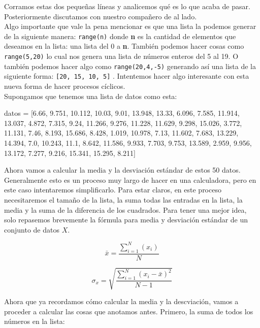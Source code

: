 \documentclass[10pt,letterpaper]{article}
\newcommand{\inlinecode}[1]{
\colorbox{light-gray}{\texttt{#1}}
}
\newenvironment{Code}
{
\begin{lrbox}{\selvestebox}%
\begin{minipage}{\dimexpr\columnwidth-2\fboxsep\relax}
\fontfamily{\ttdefault}\selectfont
}
{\end{minipage}\end{lrbox}%
\begin{center}
\colorbox{light-gray}{\usebox{\selvestebox}}
\end{center}
}
\begin{document}
Corramos estas dos peque\~nas l\'ineas y analicemos qu\'e es lo que acaba de pasar. Posteriormente discutamos con nuestro compa\~nero de al lado.\\

Algo importante que vale la pena mencionar es que una lista la podemos generar de la siguiente manera: \inlinecode{range(n)} donde \textbf{n} es la cantidad de elementos que deseamos en la lista: una lista del 0 a \textbf{n}. Tambi\'en podemos hacer cosas como \inlinecode{range(5,20)} lo cual nos genera una lista de n\'umeros enteros del 5 al 19. O tambi\'en podemos hacer algo como \inlinecode{range(20,4,-5)} generando as\'i una lista de la siguiente forma: \inlinecode{[20, 15, 10, 5]}. Intentemos hacer algo interesante con esta nueva forma de hacer procesos c\'iclicos.\\

Supongamos que tenemos una lista de datos como esta:
\begin{Code}
datos = [6.66, 9.751, 10.112, 10.03, 9.01, 13.948, 13.33, 6.096, 7.585, 11.914, 13.037, 4.872, 7.315, 9.24, 11.266, 9.276, 11.228, 11.629, 9.298, 15.026, 3.772, 11.131, 7.46, 8.193, 15.686, 8.428, 1.019, 10.978, 7.13, 11.602, 7.683, 13.229, 14.394, 7.0, 10.243, 11.1, 8.642, 11.586, 9.933, 7.703, 9.753, 13.589, 2.959, 9.956, 13.172, 7.277, 9.216, 15.341, 15.295, 8.211]
\end{Code}
Ahora vamos a calcular la media y la desviaci\'on est\'andar de estos 50 datos. Generalmente esto es un proceso muy largo de hacer en una calculadora, pero en este caso intentaremos simplificarlo. Para estar claros, en este proceso necesitaremos el tama\~no de la lista, la suma todas las entradas en la lista, la media y la suma de la diferencia de los cuadrados. Para tener una mejor idea, solo repasemos brevemente la f\'ormula para media y desviaci\'on est\'andar de un conjunto de datos $X$.

\begin{equation}
\bar{x} = \frac{\sum_{i = 1}^{N} \left( x_i \right)}{N}
\end{equation}

\begin{equation}
\sigma_x = \sqrt{\frac{\sum_{i = 1}^{N} \left( x_i - \bar{x} \right)^2}{N - 1}}
\end{equation}

Ahora que ya recordamos c\'omo calcular la media y la descviaci\'on, vamos a proceder a calcular las cosas que anotamos antes. Primero, la suma de todos los n\'umeros en la lista:
\end{document}
